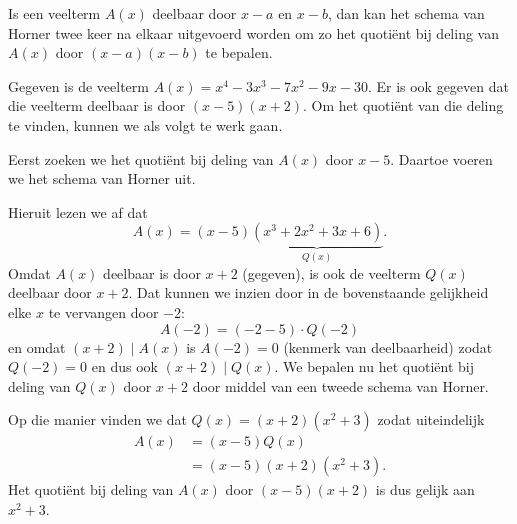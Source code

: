 \documentclass{ximera}
\begin{document}
Is een veelterm \(A(x)\) deelbaar door \(x-a\) en \(x-b\), dan kan het schema van Horner twee keer na elkaar uitgevoerd worden om zo het quotiënt bij deling van \(A(x)\) door \((x-a)(x-b)\) te bepalen. 

\begin{example} 
Gegeven is de veelterm \(A(x) = x^4 - 3x^3 - 7x^2 - 9 x - 30\). Er is ook gegeven dat die veelterm deelbaar is door \((x-5)(x+2)\). Om het quotiënt van die deling te vinden, kunnen we als volgt te werk gaan.

Eerst zoeken we het quotiënt bij deling van \(A(x)\) door \(x-5\). Daartoe voeren we het schema van Horner uit.
\renewcommand{\kolbreed}{\widthof{\(-30\)}}



Hieruit lezen we af dat
\[
A(x) = (x-5)\underbrace{(x^3 + 2x^2 + 3x + 6)}_{Q(x)}.
\] 
Omdat \(A(x)\) deelbaar is door \(x+2\) (gegeven), is ook de veelterm \(Q(x)\) deelbaar door \(x+2\). Dat kunnen we inzien door in de bovenstaande gelijkheid elke \(x\) te vervangen door \(-2\):
\[
A(-2) = (-2-5)\cdot Q(-2)
\]
en omdat \((x+2) \mid A(x)\) is \(A(-2) = 0\) (kenmerk van deelbaarheid) zodat \(Q(-2) = 0\) en dus ook \((x+2) \mid Q(x)\). We bepalen nu het quotiënt bij deling van \(Q(x)\) door \(x+2\) door middel van een tweede schema van Horner.
\renewcommand{\kolbreed}{\widthof{\(-6\)}}



Op die manier vinden we dat \(Q(x) = (x+2)(x^2+3)\) zodat uiteindelijk
\begin{align*}
A(x) 
& = (x-5)Q(x) \\
& = (x-5)(x+2)(x^2+3).
\end{align*}
Het quotiënt bij deling van \(A(x)\) door \((x-5)(x+2)\) is dus gelijk aan \(x^2+3\). 
\end{example} 
\end{document}
